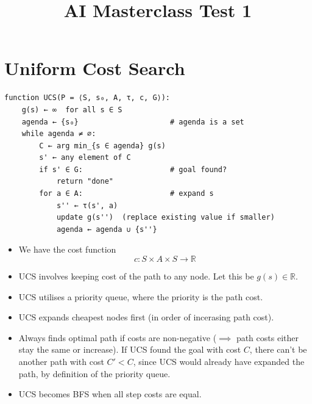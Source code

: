 \documentclass[12pt, a4paper]{article}
\title{AI Masterclass Test 1}
\author{}
\date{}
\begin{document}
\section{Uniform Cost Search}
\begin{algorithm}[H]

\end{algorithm}
\begin{Verbatim}
function UCS(P = ⟨S, s₀, A, τ, c, G⟩):
    g(s) ← ∞  for all s ∈ S
    agenda ← {s₀}                     # agenda is a set
    while agenda ≠ ∅:
        C ← arg min_{s ∈ agenda} g(s)
        s' ← any element of C
        if s' ∈ G:                    # goal found?
            return "done"
        for a ∈ A:                    # expand s
            s'' ← τ(s', a)
            update g(s'')  (replace existing value if smaller)
            agenda ← agenda ∪ {s''}
\end{Verbatim}

\begin{itemize}
    \item We have the cost function
    \[c: S \times A \times S \rightarrow \mathbb{R}\]
    \item UCS involves keeping cost of the path to any node. Let this be $g(s) \in \mathbb{R}$.
    \item UCS utilises a priority queue, where the priority is the path cost.
    \item UCS expands cheapest nodes first (in order of incerasing path cost).
    \item Always finds optimal path if costs are non-negative ($\implies$ path costs either stay the same or increase). 
    If UCS found the goal with cost $C$,
    there can't be another path with cost $C' < C$, since UCS would already have expanded the path,
    by definition of the priority queue.
    \item UCS becomes BFS when all step costs are equal.
\end{itemize}
\end{document}
